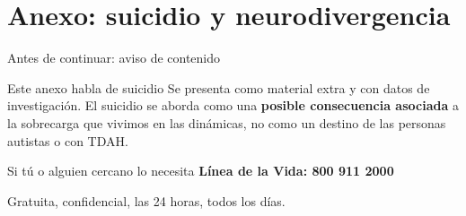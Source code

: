 
\section{Anexo: suicidio y neurodivergencia}

\begin{frame}{Antes de continuar: aviso de contenido}
  \begin{alertblock}{Este anexo habla de suicidio}
    \small
    Se presenta como material extra y con datos de investigación. El suicidio
    se aborda como una \textbf{posible consecuencia asociada} a la sobrecarga
    que vivimos en las dinámicas, no como un destino de las personas autistas
    o con TDAH.
  \end{alertblock}

  \vspace{0.4cm}
  \begin{block}{Si tú o alguien cercano lo necesita}
    \centering
    {\Large\bfseries\color{ColorPrincipal} Línea de la Vida: 800 911 2000}\par
    \vspace{0.1cm}
    {\small Gratuita, confidencial, las 24 horas, todos los días.}\par
  \end{block}
\end{frame}

